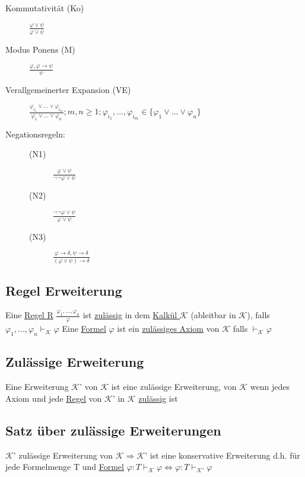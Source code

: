 \documentclass[12pt,a4paper]{article} %
\begin{document}
	\begin{description}
		\item[Kommutativität (Ko)] $\frac{\varphi \lor \psi}{\varphi \lor \psi}$
		\item[Modus Ponens (M)] $\frac{\varphi, \varphi \rightarrow \psi}{\psi}$
		\item[Verallgemeinerter Expansion (VE)] $\frac{\varphi_{i_1} \lor ... \lor \varphi_{i_m}}{\varphi_1 \lor ... \lor \varphi_n}; m, n \ge 1; \varphi_{i_1}, ..., \varphi_{i_m} \in \{\varphi_1 \lor ... \lor \varphi_n\}$
		\item[Negationsregeln:] \begin{description}
			\item[(N1)] $\frac{\varphi \lor \psi}{\neg \neg \varphi \lor \psi}$
			\item[(N2)] $\frac{\neg \neg \varphi \lor \psi}{\varphi \lor \psi}$
			\item[(N3)] $\frac{\varphi \rightarrow \delta, \psi \rightarrow \delta}{(\varphi \lor \psi) \rightarrow \delta}$
		\end{description}
	\end{description}
	
	\subsection{Regel Erweiterung}
	Eine \hyperref[Kalkul]{Regel R} $\frac{\varphi_1, ..., \varphi_n}{\varphi}$ ist \hyperref[Zulassig]{zulässig} in dem \hyperref[Kalkul]{Kalkül $\mathcal{K}$} (ableitbar in $\mathcal{K}$), falls $\varphi_1, ..., \varphi_n \hyperref[Beweisbar]{\vdash_{\mathcal{K}}} \varphi$ \newline
	Eine \hyperref[Formel]{Formel} $\varphi$ ist ein \hyperref[Zulassig]{zulässiges Axiom} von $\mathcal{K}$ falls $\hyperref[Beweisbar]{\vdash_{\mathcal{K}}} \varphi$
	
	\subsection{Zulässige Erweiterung}
	Eine Erweiterung $\mathcal{K}$' von $\mathcal{K}$ ist eine zulässige Erweiterung, von $\mathcal{K}$ wenn jedes Axiom und jede \hyperref[Kalkul]{Regel} von $\mathcal{K}$' in $\mathcal{K}$ \hyperref[Zulassig]{zulässig} ist
	
	\subsection{Satz über zulässige Erweiterungen}
	$\mathcal{K}$' zulässige Erweiterung von $\mathcal{K} \Rightarrow \mathcal{K}$' ist eine konservative Erweiterung d.h. für jede Formelmenge T und \hyperref[Formel]{Formel} $\varphi: T \hyperref[Beweisbar]{\vdash_{\mathcal{K}}} \varphi \Leftrightarrow \varphi: T \hyperref[Beweisbar]{\vdash_{\mathcal{K}'}} \varphi$
	
\end{document}
